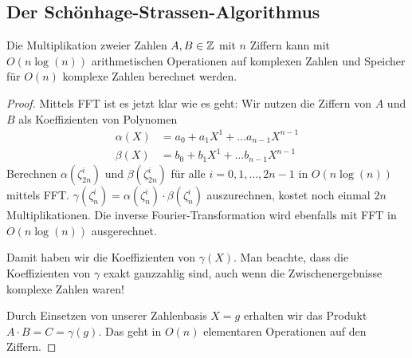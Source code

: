
\subsection{Der Schönhage-Strassen-Algorithmus}\label{schoenhage-strassen}

\begin{corollary}
    Die Multiplikation zweier Zahlen $A,B\in\mathbb{Z}$ mit $n$ Ziffern kann mit $O(n\log(n))$ arithmetischen Operationen auf komplexen Zahlen und Speicher für $O(n)$ komplexe Zahlen berechnet werden.
\end{corollary}
\begin{proof}
    Mittels FFT ist es jetzt klar wie es geht: Wir nutzen die Ziffern von $A$ und $B$ als Koeffizienten von Polynomen
    \begin{align*}
        \alpha(X) &= a_0 + a_1 X^1 + \ldots a_{n-1} X^{n-1}\\
        \beta(X)  &= b_0 + b_1 X^1 + \ldots b_{n-1} X^{n-1}
    \end{align*}
    Berechnen $\alpha(\zeta_{2n}^i)$ und $\beta(\zeta_{2n}^i)$ für alle $i=0,1,\ldots,2n-1$ in $O(n\log(n))$ mittels FFT. $\gamma(\zeta_n^i) = \alpha(\zeta_n^i)\cdot\beta(\zeta_n^i)$ auszurechnen, kostet noch einmal $2n$ Multiplikationen. Die inverse Fourier-Transformation wird ebenfalls mit FFT in $O(n\log(n))$ ausgerechnet.

    Damit haben wir die Koeffizienten von $\gamma(X)$. Man beachte, dass die Koeffizienten von $\gamma$ exakt ganzzahlig sind, auch wenn die Zwischenergebnisse komplexe Zahlen waren!

    Durch Einsetzen von unserer Zahlenbasis $X=g$ erhalten wir das Produkt $A\cdot B = C=\gamma(g)$. Das geht in $O(n)$ elementaren Operationen auf den Ziffern.
\end{proof}

